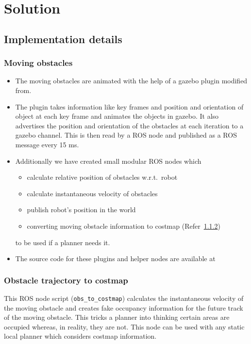 
\chapter{Solution}

\section{Implementation details}
\label{sec:implementation_details}

\subsection{Moving obstacles}%
\label{sub:moving_obstacles}

\begin{itemize}
    \item The moving obstacles are animated with the help of a gazebo plugin modified from\cite{animatedBox}.
    \item The plugin takes information like key frames and position and orientation of object at each
        key frame and animates the objects in gazebo. It also advertises the position and orientation
        of the obstacles at each iteration to a gazebo channel. This is then read by a ROS node and 
        published as a ROS message every 15 ms.
    \item Additionally we have created small modular ROS nodes which 
        \begin{itemize}
            \item calculate relative position of obstacles w.r.t.\ robot
            \item calculate instantaneous velocity of obstacles
            \item publish robot's position in the world
            \item converting moving obstacle information to costmap (Refer~\ref{sub:obstacle_trajectory_to_costmap})
        \end{itemize} 
        to be used if a planner needs it.
    \item The source code for these plugins and helper nodes are available at~\cite{movingObstacleGazebo}
\end{itemize}

\subsection{Obstacle trajectory to costmap}%
\label{sub:obstacle_trajectory_to_costmap}
    This ROS node script (\texttt{obs\_to\_costmap}) calculates the instantaneous velocity of the 
    moving obstacle and creates fake occupancy information for the future track of the moving obstacle. 
    This tricks a planner into thinking certain areas are occupied whereas, in reality, they are not. 
    This node can be used with any static local planner which considers costmap\cite{costmap} information.
    

